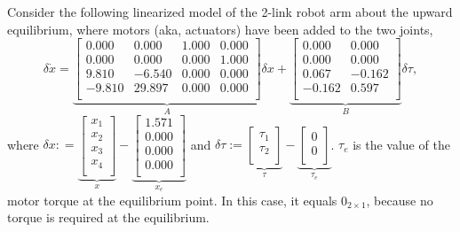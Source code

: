 \begin{example} 
\label{ex:StabilizeNonlinear2LinkRobotArmUpwardEquilibrium}
Consider the following linearized model of the 2-link robot arm about the upward equilibrium, where motors (aka, actuators) have been added to the two joints, 
\begin{equation}
\delta \dot{x} = \underbrace{\left[
\begin{array}{rrrr}
0.000 & 0.000 & 1.000 & 0.000 \\
0.000 & 0.000 & 0.000 & 1.000 \\
9.810 & -6.540 & 0.000 & 0.000 \\
-9.810 & 29.897 & 0.000 & 0.000 \\
\end{array}
\right]}_{A} \delta x + \underbrace{\left[
\begin{array}{rr}
0.000 & 0.000 \\
0.000 & 0.000 \\
0.067 & -0.162 \\
-0.162 & 0.597 \\
\end{array}
\right]}_{B} \delta \tau,
\end{equation}
where $ \delta x: = \underbrace{\left[\begin{array}{r}
x_1 \\
x_2 \\
x_3 \\
x_4\\
\end{array}
\right]}_{x}- \underbrace{\left[
\begin{array}{r}
1.571 \\
0.000 \\
0.000 \\
0.000 \\
\end{array}
\right]}_{x_e} $ and  $\delta \tau := \underbrace{\left[\begin{array}{r}
\tau_1 \\
\tau_2 \\
\end{array}
\right]}_{\tau} - \underbrace{\left[\begin{array}{r}
0\\
0 \\
\end{array}
\right]}_{\tau_e} $. $\tau_e$ is the value of the motor torque at the equilibrium point. In this case, it equals $0_{2 \times 1}$, because no torque is required at the equilibrium.\\



\end{example}
